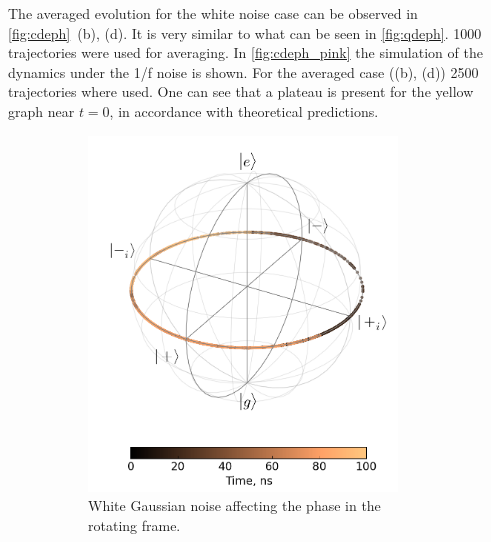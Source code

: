 \documentclass[12pt]{report}
\numberwithin{equation}{section}
\begin{document}
The averaged evolution for the white noise case can be observed in \autoref{fig:cdeph}~(b), (d). It is very similar to what can be seen in \autoref{fig:qdeph}. 1000 trajectories were used for averaging.
In \autoref{fig:cdeph_pink} the simulation of the dynamics under the 1/f noise is shown. For the averaged case ((b), (d)) 2500 trajectories where used. One can see that a plateau is present for the yellow graph near $t=0$, in accordance with theoretical predictions.
\begin{figure}
\begingroup
\captionsetup[subfigure]{width=0.9\textwidth}
\centering
\begin{subfigure}[t]{0.45\textwidth}
\centering
\includegraphics[width=0.9\textwidth]{cdeph_bloch_rf}
\caption{White Gaussian noise affecting the phase in the rotating frame.}
\end{subfigure}
\begin{subfigure}[t]{0.45\textwidth}
\centering

\end{subfigure}
\end{figure}
\end{document}
